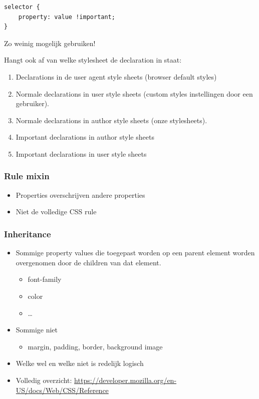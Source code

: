 \documentclass{article}
\begin{document}
\begin{lstlisting}
selector {     
    property: value !important; 
}
\end{lstlisting}

Zo weinig mogelijk gebruiken!

Hangt ook af van welke stylesheet de declaration in staat:
\begin{enumerate}
    \item Declarations in de user agent style sheets (browser default styles)
    \item Normale declarations in user style sheets (custom styles instellingen door een gebruiker). 
    \item Normale declarations in author style sheets (onze stylesheets). 
    \item Important declarations in author style sheets
    \item Important declarations in user style sheets
\end{enumerate}

\subsubsection{Rule mixin}
\begin{itemize}
    \item Properties overschrijven andere properties
    \item Niet de volledige CSS rule
\end{itemize}

\subsubsection{Inheritance}
\begin{itemize}
    \item Sommige property values die toegepast worden op een parent element worden overgenomen door de children van dat element.
    \begin{itemize}
        \item font-family
        \item color
        \item \dots
    \end{itemize}
    \item Sommige niet
    \begin{itemize}
        \item margin, padding, border, background image
    \end{itemize}
    \item Welke wel en welke niet is redelijk logisch
    \item Volledig overzicht: \url{https://developer.mozilla.org/en-US/docs/Web/CSS/Reference}
\end{itemize}
\end{document}
